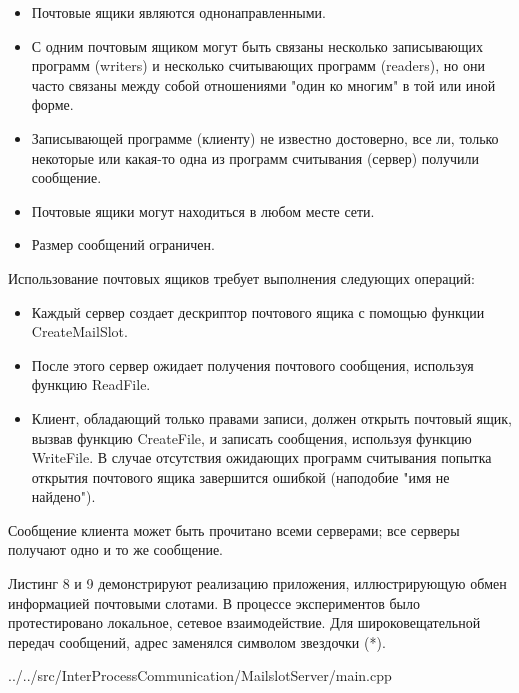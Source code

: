 \documentclass[a4paper, 12pt]{report}		%
\begin{document}
\begin{itemize}
\item Почтовые ящики являются однонаправленными.

\item С одним почтовым ящиком могут быть связаны несколько записывающих программ (writers) и несколько считывающих программ (readers), но они часто связаны между собой отношениями "один ко многим" в той или иной форме.

\item Записывающей программе (клиенту) не известно достоверно, все ли, только некоторые или какая-то одна из программ считывания (сервер) получили сообщение.

\item Почтовые ящики могут находиться в любом месте сети.

\item Размер сообщений ограничен.
\end{itemize}

Использование почтовых ящиков требует выполнения следующих операций:
\begin{itemize}
\item Каждый сервер создает дескриптор почтового ящика с помощью функции CreateMailSlot.

\item После этого сервер ожидает получения почтового сообщения, используя функцию ReadFile.

\item Клиент, обладающий только правами записи, должен открыть почтовый ящик, вызвав функцию CreateFile, и записать сообщения, используя функцию WriteFile. В случае отсутствия ожидающих программ считывания попытка открытия почтового ящика завершится ошибкой (наподобие "имя не найдено").
\end{itemize}

Сообщение клиента может быть прочитано всеми серверами; все серверы получают одно и то же сообщение.

Листинг 8 и 9 демонстрируют реализацию приложения, иллюстрирующую обмен информацией почтовыми слотами. В процессе экспериментов было протестировано локальное, сетевое взаимодействие. Для широковещательной передач сообщений, адрес заменялся символом звездочки (*).


{../../src/InterProcessCommunication/MailslotServer/main.cpp}
\end{document}
